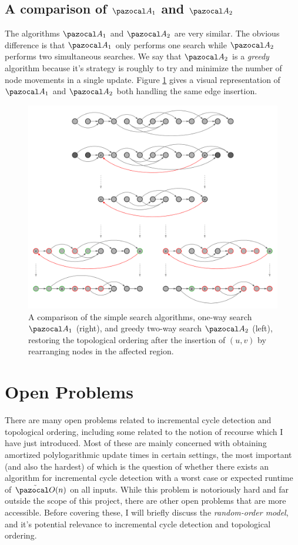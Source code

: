 \documentclass{report}
\begin{document}
\subsection{A comparison of $\pazocal A_1$ and $\pazocal A_2$}

The algorithms $\pazocal A_1$ and $\pazocal A_2$ are very similar. The obvious difference is that $\pazocal A_1$ only performs one search while $\pazocal A_2$ performs two simultaneous searches. We say that $\pazocal A_2$ is a \textit{greedy} algorithm because it's strategy is roughly to try and minimize the number of node movements in a single update. Figure \ref{fig:simplesearch} gives a visual representation of $\pazocal A_1$ and $\pazocal A_2$ both handling the same edge insertion.

\begin{figure}[htp]
    \centering
    \centerline{\includegraphics[width=16cm]{Simple Algos.png}}
    \caption{A comparison of the simple search algorithms, one-way search $\pazocal A_1$ (right), and greedy two-way search $\pazocal A_2$ (left), restoring the topological ordering after the insertion of $(u,v)$ by rearranging nodes in the affected region.}
    \label{fig:simplesearch}
\end{figure}

\section{Open Problems}

There are many open problems related to incremental cycle detection and topological ordering, including some related to the notion of recourse which I have just introduced. Most of these are mainly concerned with obtaining amortized polylogarithmic update times in certain settings, the most important (and also the hardest) of which is the question of whether there exists an algorithm for incremental cycle detection with a worst case or expected runtime of $\tilde{\pazocal O}(n)$ on all inputs. While this problem is notoriously hard and far outside the scope of this project, there are other open problems that are more accessible. Before covering these, I will briefly discuss the \textit{random-order model}, and it's potential relevance to incremental cycle detection and topological ordering.
\end{document}
